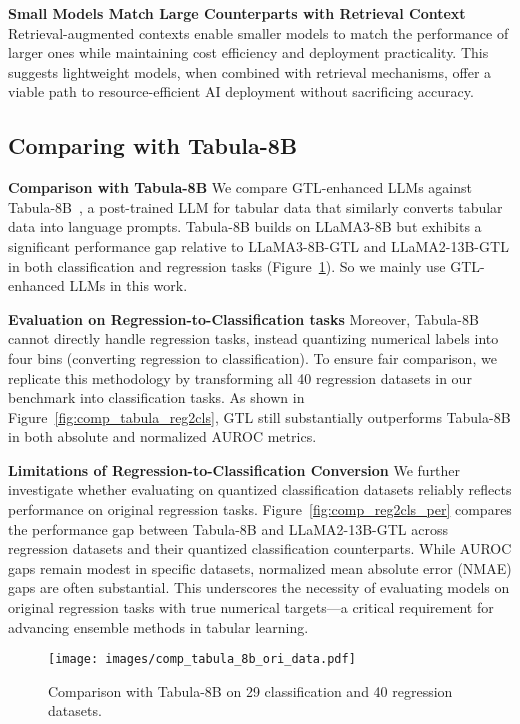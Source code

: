 \textbf{Small Models Match Large Counterparts with Retrieval Context} Retrieval-augmented contexts enable smaller models to match the performance of larger ones while maintaining cost efficiency and deployment practicality. This suggests lightweight models, when combined with retrieval mechanisms, offer a viable path to resource-efficient AI deployment without sacrificing accuracy.

\subsection{Comparing with Tabula-8B}
\label{app:exp_comp_tabula}

\textbf{Comparison with Tabula-8B} We compare GTL-enhanced LLMs against Tabula-8B~\citep{gardner2024TabuLa}, a post-trained LLM for tabular data that similarly converts tabular data into language prompts. Tabula-8B builds on LLaMA3-8B but exhibits a significant performance gap relative to LLaMA3-8B-GTL and LLaMA2-13B-GTL in both classification and regression tasks (Figure~\ref{fig:comp_tabula_ori}).
So we mainly use GTL-enhanced LLMs in this work.

\textbf{Evaluation on Regression-to-Classification tasks} Moreover, Tabula-8B cannot directly handle regression tasks, instead quantizing numerical labels into four bins (converting regression to classification). To ensure fair comparison, we replicate this methodology by transforming all 40 regression datasets in our benchmark into classification tasks. As shown in Figure~\ref{fig:comp_tabula_reg2cls}, GTL still substantially outperforms Tabula-8B in both absolute and normalized AUROC metrics.

\textbf{Limitations of Regression-to-Classification Conversion} We further investigate whether evaluating on quantized classification datasets reliably reflects performance on original regression tasks. Figure~\ref{fig:comp_reg2cls_per} compares the performance gap between Tabula-8B and LLaMA2-13B-GTL across regression datasets and their quantized classification counterparts. While AUROC gaps remain modest in specific datasets, normalized mean absolute error (NMAE) gaps are often substantial. This underscores the necessity of evaluating models on original regression tasks with true numerical targets—a critical requirement for advancing ensemble methods in tabular learning.

\begin{figure}[t]
    \centering
    \texttt{[image: images/comp\_tabula\_8b\_ori\_data.pdf]}
    \caption{Comparison with Tabula-8B on 29 classification and 40 regression datasets.}
    \label{fig:comp_tabula_ori}
\end{figure}

